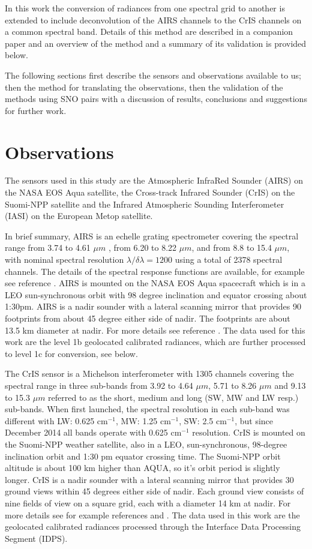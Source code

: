\documentclass[twocolumn,10pt]{article}
\begin{document}
In this work the conversion of radiances from one spectral grid to another is extended to include deconvolution of the AIRS channels to the CrIS channels on a common spectral band. Details of this method are described in a companion paper \cite{Motteler2017a} and an overview of the method and a summary of its validation is provided below. 

The following sections first describe the sensors and observations available to us; then the method for translating the observations, then the validation of the methods using SNO pairs with a discussion of results, conclusions and suggestions for further work.

\section{Observations}
\label{sec:orgheadline3}

The sensors used in this study are the Atmospheric InfraRed Sounder (AIRS) on the NASA EOS Aqua satellite, the Cross-track Infrared Sounder (CrIS) on the Suomi-NPP satellite and the Infrared Atmospheric Sounding Interferometer (IASI) on the European Metop satellite.

In brief summary, AIRS is an echelle grating spectrometer covering the spectral range from 3.74 to 4.61 $\mu m$ , from 6.20 to 8.22 $\mu m$, and from 8.8 to 15.4 $\mu m$, with nominal spectral resolution $\lambda/\delta\lambda= 1200$ using a total of 2378 spectral channels. The details of the spectral response functions are available, for example see reference \cite{airscalib}. AIRS is mounted on the NASA EOS Aqua spacecraft which is in a LEO sun-synchronous orbit with 98 degree inclination and equator crossing about 1:30pm. AIRS is a nadir sounder with a lateral scanning mirror that provides 90 footprints from about 45 degree either side of nadir. The footprints are about 13.5 km diameter at nadir. For more details see reference \cite{airseos}. The data used for this work are the level 1b geolocated calibrated radiances, which are further processed to level 1c for conversion, see below.

The CrIS sensor is a Michelson interferometer with 1305 channels covering the spectral range in three sub-bands from 3.92 to 4.64 $\mu m$, 5.71 to 8.26 $\mu m$ and 9.13 to 15.3 $\mu m$ referred to as the short, medium and long (SW, MW and LW resp.) sub-bands. When first launched, the spectral resolution in each sub-band was different with LW: 0.625 cm$^{-1}$, MW: 1.25 cm$^{-1}$, SW: 2.5 cm$^{-1}$, but since December 2014 all bands operate with 0.625 cm$^{-1}$ resolution. CrIS is mounted on the Suomi-NPP weather satellite, also in a LEO, sun-synchronous, 98-degree inclination orbit and 1:30 pm equator crossing time. The Suomi-NPP orbit altitude is about 100 km higher than AQUA, so it's orbit period is slightly longer. CrIS is a nadir sounder with a lateral scanning mirror that provides 30 ground views within 45 degrees either side of nadir. Each ground view consists of nine fields of view on a square grid, each with a diameter 14 km at nadir. For more details see for example references \cite{crisweb} and \cite{criscal}. The data used in this work are the geolocated calibrated radiances processed through the Interface Data Processing Segment (IDPS).
\end{document}

